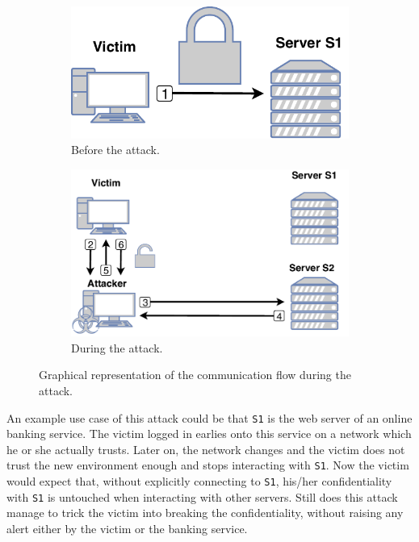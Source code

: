 \begin{figure}[t!]
	\centering
	\begin{subfigure}{0.4\textwidth}
	\includegraphics[width=\textwidth]{img/pre-attack}
		\caption{Before the attack.}
	\end{subfigure}

	\begin{subfigure}{0.4\textwidth}
		\includegraphics[width=\textwidth]{img/attack}
		\caption{During the attack.}
	\end{subfigure}
\caption{
	Graphical representation of the communication flow during the attack.}
	\label{fig:attack-scenario}
\end{figure}

An example use case of this attack could be that \texttt{S1} is the web server of an online banking service. The victim logged in earlies onto this service on a network which he or she actually trusts. Later on, the network changes and the victim does not trust the new environment enough and stops interacting with \texttt{S1}. Now the victim would expect that, without explicitly connecting to \texttt{S1}, his/her confidentiality with \texttt{S1} is untouched when interacting with other servers. Still does this attack manage to trick the victim into breaking the confidentiality, without raising any alert either by the victim or the banking service.
